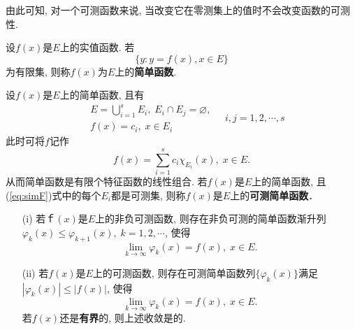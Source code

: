 由此可知, 对一个可测函数来说, 当改变它在零测集上的值时不会改变函数的可测性. 

\begin{definition}[简单函数]
	设$f(x)$是$E$上的实值函数. 若
	$$
		\{ y: y = f(x), x \in E \}
	$$
	为有限集, 则称$f(x)$为$E$上的\textbf{简单函数}. 
\end{definition}
设$f(x)$是$E$上的简单函数, 且有
$$
	\begin{aligned}
		& E = \bigcup\limits_{i=1}^s E_i, \; E_i \cap E_j = \varnothing, \\
		& f(x) = c_i, \; x \in E_i
	\end{aligned}
	\quad i,j = 1,2,\cdots,s
$$
此时可将$f$记作
\begin{equation}
	f(x) = \sum\limits_{i=1}^s c_i \chi_{E_i}(x), \; x \in E. \label{eq:simF}
\end{equation}
从而简单函数是有限个特征函数的线性组合. 
若$f(x)$是$E$上的简单函数, 且(\ref{eq:simF})式中的每个$E_i$都是可测集, 则称$f(x)$是$E$上的\textbf{可测简单函数}．

\begin{theorem}[Riesz表示定理] \label{thm:Riesz1}
	\begin{enumerate}
		\item[(i)] 若$ｆ(x)$是$E$上的非负可测函数, 则存在非负可测的简单函数渐升列$\varphi_k(x) \leq \varphi_{k+1}(x),\; k=1,2,\cdots$, 使得
		$$
			\lim\limits_{k \to \infty} \varphi_k(x) = f(x),\; x \in E.
		$$
		\item[(ii)] 若$f(x)$是$E$上的可测函数, 则存在可测简单函数列$\{ \varphi_k(x) \}$满足$|\varphi_k(x) | \leq |f(x)|$, 使得
		$$
			\lim\limits_{k \to \infty} \varphi_k(x) = f(x),\; x \in E.
		$$
		若$f(x)$还是\textbf{有界}的, 则上述收敛是的. 
	\end{enumerate}
\end{theorem}

